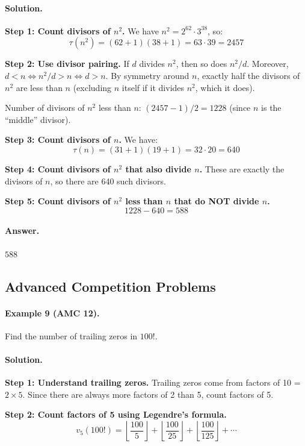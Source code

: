 \documentclass[12pt]{extarticle}
\begin{document}
\paragraph{Solution.}
\textbf{Step 1: Count divisors of $n^2$.} We have $n^2 = 2^{62} \cdot 3^{38}$, so:
\[
\tau(n^2) = (62+1)(38+1) = 63 \cdot 39 = 2457
\]

\textbf{Step 2: Use divisor pairing.} If $d$ divides $n^2$, then so does $n^2/d$. Moreover, $d < n \iff n^2/d > n \iff d > n$. By symmetry around $n$, exactly half the divisors of $n^2$ are less than $n$ (excluding $n$ itself if it divides $n^2$, which it does).

Number of divisors of $n^2$ less than $n$: $(2457 - 1)/2 = 1228$ (since $n$ is the ``middle'' divisor).

\textbf{Step 3: Count divisors of $n$.} We have:
\[
\tau(n) = (31+1)(19+1) = 32 \cdot 20 = 640
\]

\textbf{Step 4: Count divisors of $n^2$ that also divide $n$.} These are exactly the divisors of $n$, so there are 640 such divisors.

\textbf{Step 5: Count divisors of $n^2$ less than $n$ that do NOT divide $n$.}
\[
1228 - 640 = 588
\]

\paragraph{Answer.} $\boxed{588}$

\subsection{Advanced Competition Problems}

\paragraph{Example 9 (AMC 12).} Find the number of trailing zeros in $100!$.

\paragraph{Solution.}
\textbf{Step 1: Understand trailing zeros.} Trailing zeros come from factors of 10 = $2 \times 5$. Since there are always more factors of 2 than 5, count factors of 5.

\textbf{Step 2: Count factors of 5 using Legendre's formula.}
\[
v_5(100!) = \left\lfloor \frac{100}{5} \right\rfloor + \left\lfloor \frac{100}{25} \right\rfloor + \left\lfloor \frac{100}{125} \right\rfloor + \cdots
\]
\end{document}
